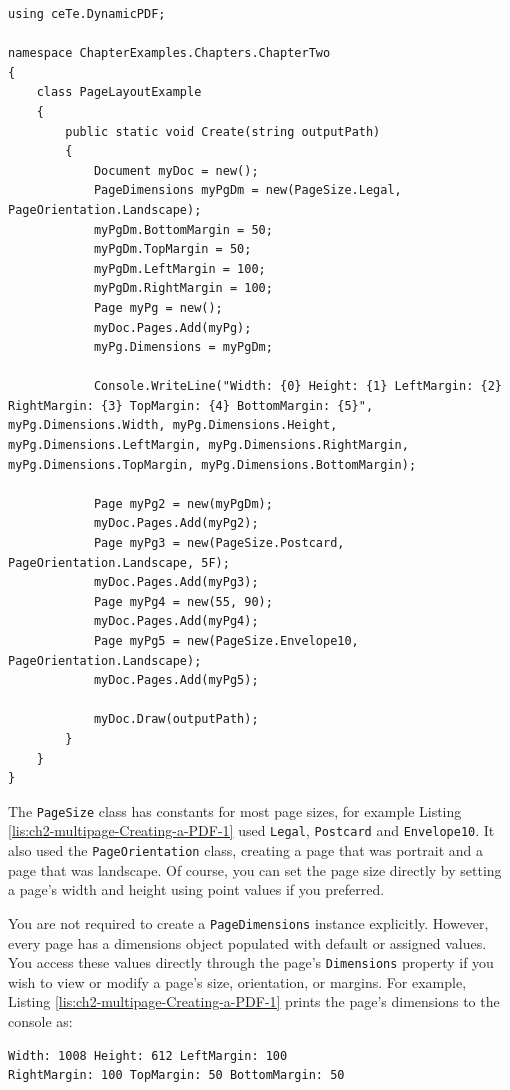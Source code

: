 \documentclass[american,letterpaper]{tufte-book}
\numberwithin{equation}{section}
\numberwithin{figure}{section}
\begin{document}
\bgroup{}
\begin{lstlisting}[caption={Creating a PDF with different page sizes.},label={lis:ch2-multipage-Creating-a-PDF-1},basicstyle={\small\ttfamily},breaklines=true]
using ceTe.DynamicPDF;

namespace ChapterExamples.Chapters.ChapterTwo
{
    class PageLayoutExample
    {
        public static void Create(string outputPath)
        {
            Document myDoc = new();
            PageDimensions myPgDm = new(PageSize.Legal, PageOrientation.Landscape);
            myPgDm.BottomMargin = 50;
            myPgDm.TopMargin = 50;
            myPgDm.LeftMargin = 100;
            myPgDm.RightMargin = 100;
            Page myPg = new();
            myDoc.Pages.Add(myPg);
            myPg.Dimensions = myPgDm;

            Console.WriteLine("Width: {0} Height: {1} LeftMargin: {2} RightMargin: {3} TopMargin: {4} BottomMargin: {5}", myPg.Dimensions.Width, myPg.Dimensions.Height, myPg.Dimensions.LeftMargin, myPg.Dimensions.RightMargin, myPg.Dimensions.TopMargin, myPg.Dimensions.BottomMargin);

            Page myPg2 = new(myPgDm);
            myDoc.Pages.Add(myPg2);
            Page myPg3 = new(PageSize.Postcard, PageOrientation.Landscape, 5F);
            myDoc.Pages.Add(myPg3);
            Page myPg4 = new(55, 90);
            myDoc.Pages.Add(myPg4);
            Page myPg5 = new(PageSize.Envelope10, PageOrientation.Landscape);
            myDoc.Pages.Add(myPg5);
            
            myDoc.Draw(outputPath);
        }
    }
}
\end{lstlisting}
\leavevmode\egroup

The \texttt{PageSize} class has constants for most page sizes, for
example Listing \ref{lis:ch2-multipage-Creating-a-PDF-1} used \texttt{Legal},
\texttt{Postcard} and \texttt{Envelope10}. It also used the \texttt{PageOrientation}
class, creating a page that was portrait and a page that was landscape.
Of course, you can set the page size directly by setting a page's
width and height using point values if you preferred.

You are not required to create a \texttt{PageDimensions} instance
explicitly. However, every page has a dimensions object populated
with default or assigned values. You access these values directly
through the page's \texttt{Dimensions} property if you wish to view
or modify a page's size, orientation, or margins. For example, Listing
\ref{lis:ch2-multipage-Creating-a-PDF-1} prints the page's dimensions to the console as: 
{\ttfamily\bgroup{}
\begin{lstlisting}[basicstyle={\small\ttfamily},breaklines=true]
Width: 1008 Height: 612 LeftMargin: 100
RightMargin: 100 TopMargin: 50 BottomMargin: 50
\end{lstlisting}
\leavevmode\egroup
}
\end{document}
